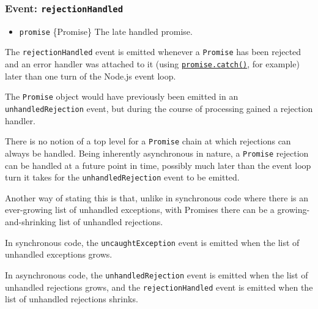 \subsubsection{\texorpdfstring{Event:
\texttt{\textquotesingle{}rejectionHandled\textquotesingle{}}}{Event: \textquotesingle rejectionHandled\textquotesingle{}}}\label{event-rejectionhandled}

\begin{itemize}
\tightlist
\item
  \texttt{promise} \{Promise\} The late handled promise.
\end{itemize}

The \texttt{\textquotesingle{}rejectionHandled\textquotesingle{}} event
is emitted whenever a \texttt{Promise} has been rejected and an error
handler was attached to it (using
\href{https://developer.mozilla.org/en-US/docs/Web/JavaScript/Reference/Global_Objects/Promise/catch}{\texttt{promise.catch()}},
for example) later than one turn of the Node.js event loop.

The \texttt{Promise} object would have previously been emitted in an
\texttt{\textquotesingle{}unhandledRejection\textquotesingle{}} event,
but during the course of processing gained a rejection handler.

There is no notion of a top level for a \texttt{Promise} chain at which
rejections can always be handled. Being inherently asynchronous in
nature, a \texttt{Promise} rejection can be handled at a future point in
time, possibly much later than the event loop turn it takes for the
\texttt{\textquotesingle{}unhandledRejection\textquotesingle{}} event to
be emitted.

Another way of stating this is that, unlike in synchronous code where
there is an ever-growing list of unhandled exceptions, with Promises
there can be a growing-and-shrinking list of unhandled rejections.

In synchronous code, the
\texttt{\textquotesingle{}uncaughtException\textquotesingle{}} event is
emitted when the list of unhandled exceptions grows.

In asynchronous code, the
\texttt{\textquotesingle{}unhandledRejection\textquotesingle{}} event is
emitted when the list of unhandled rejections grows, and the
\texttt{\textquotesingle{}rejectionHandled\textquotesingle{}} event is
emitted when the list of unhandled rejections shrinks.


